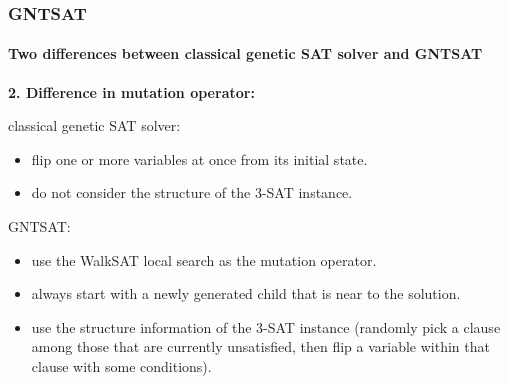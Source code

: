 \begin{frame}[t]
	\frametitle{GNTSAT}
	\framesubtitle{Two differences between classical genetic SAT solver and GNTSAT}
	\textbf{2. Difference in mutation operator:}
	\begin{alertblock}{classical genetic SAT solver:}
		\begin{itemize}
		\item flip one or more variables at once from its initial state.
		\item do not consider the structure of the 3-SAT instance.
		\end{itemize}
	\end{alertblock}
	\begin{alertblock}{GNTSAT:}	
		\begin{itemize}
		\item use the WalkSAT local search as the mutation operator.
		\item always start with a newly generated child that is near to the solution.
		\item use the structure information of the 3-SAT instance (randomly pick a clause among those that are currently unsatisfied, then flip a variable within that clause with some conditions).
		\end{itemize}
	\end{alertblock}
\end{frame}
